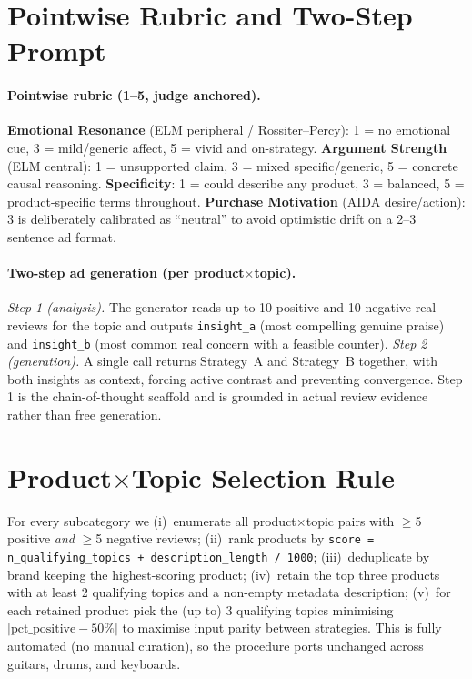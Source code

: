 \documentclass[11pt]{article}
\begin{document}
\section{Pointwise Rubric and Two-Step Prompt}
\label{app:rubric}

\paragraph{Pointwise rubric (1--5, judge anchored).}
\textbf{Emotional Resonance} (ELM peripheral / Rossiter--Percy):
1 = no emotional cue, 3 = mild/generic affect, 5 = vivid and
on-strategy.
\textbf{Argument Strength} (ELM central): 1 = unsupported claim,
3 = mixed specific/generic, 5 = concrete causal reasoning.
\textbf{Specificity}: 1 = could describe any product, 3 = balanced,
5 = product-specific terms throughout.
\textbf{Purchase Motivation} (AIDA desire/action): 3 is
deliberately calibrated as ``neutral'' to avoid optimistic drift on
a 2--3 sentence ad format.

\paragraph{Two-step ad generation (per product$\times$topic).}
\textit{Step 1 (analysis).} The generator reads up to 10 positive
and 10 negative real reviews for the topic and outputs
\texttt{insight\_a} (most compelling genuine praise) and
\texttt{insight\_b} (most common real concern with a feasible
counter).
\textit{Step 2 (generation).} A single call returns Strategy~A and
Strategy~B together, with both insights as context, forcing active
contrast and preventing convergence.
Step 1 is the chain-of-thought scaffold and is grounded in actual
review evidence rather than free generation.

\section{Product$\times$Topic Selection Rule}
\label{app:select}

For every subcategory we (i)~enumerate all
product$\times$topic pairs with $\geq$5 positive
\textit{and} $\geq$5 negative reviews; (ii)~rank products by
\texttt{score = n\_qualifying\_topics + description\_length / 1000};
(iii)~deduplicate by brand keeping the highest-scoring product;
(iv)~retain the top three products with at least 2 qualifying
topics and a non-empty metadata description; (v)~for each retained
product pick the (up to) 3 qualifying topics minimising
$|\text{pct\_positive}-50\%|$ to maximise input parity between
strategies.
This is fully automated (no manual curation), so the procedure
ports unchanged across guitars, drums, and keyboards.
\end{document}
